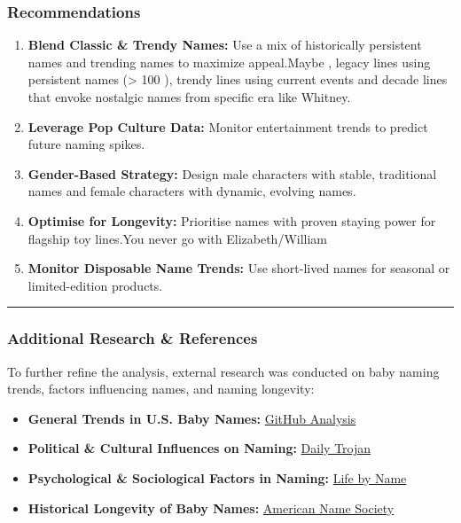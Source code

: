 \documentclass[
  man,floatsintext]{apa6}
\providecommand{\tightlist}{%
  \setlength{\itemsep}{0pt}\setlength{\parskip}{0pt}}
\begin{document}
\subsubsection{\texorpdfstring{\textbf{Recommendations}}{Recommendations}}\label{recommendations}

\begin{enumerate}
\def\labelenumi{\arabic{enumi}.}
\tightlist
\item
  \textbf{Blend Classic \& Trendy Names:} Use a mix of historically persistent names and trending names to maximize appeal.Maybe , legacy lines using persistent names (\textgreater{} 100 ), trendy lines using current events and decade lines that envoke nostalgic names from specific era like Whitney.
\item
  \textbf{Leverage Pop Culture Data:} Monitor entertainment trends to predict future naming spikes.
\item
  \textbf{Gender-Based Strategy:} Design male characters with stable, traditional names and female characters with dynamic, evolving names.
\item
  \textbf{Optimise for Longevity:} Prioritise names with proven staying power for flagship toy lines.You never go with Elizabeth/William
\item
  \textbf{Monitor Disposable Name Trends:} Use short-lived names for seasonal or limited-edition products.
\end{enumerate}

\begin{center}\rule{0.5\linewidth}{0.5pt}\end{center}

\subsubsection{\texorpdfstring{\textbf{Additional Research \& References}}{Additional Research \& References}}\label{additional-research-references}

To further refine the analysis, external research was conducted on baby naming trends, factors influencing names, and naming longevity:

\begin{itemize}
\tightlist
\item
  \textbf{General Trends in U.S. Baby Names:} \href{https://github.com/brettc17/Baby-Name-Trends-Exploring-American-Naming-Patterns}{GitHub Analysis}
\item
  \textbf{Political \& Cultural Influences on Naming:} \href{https://dailytrojan.com/2025/06/18/parents-political-beliefs-shape-us-baby-names/}{Daily Trojan}
\item
  \textbf{Psychological \& Sociological Factors in Naming:} \href{https://lifebyname.com/the-science/}{Life by Name}
\item
  \textbf{Historical Longevity of Baby Names:} \href{https://www.americannamesociety.org/long-term-sociolinguistics-trends-and-phonological-patterns-of-american-names/}{American Name Society}
\end{itemize}
\end{document}
